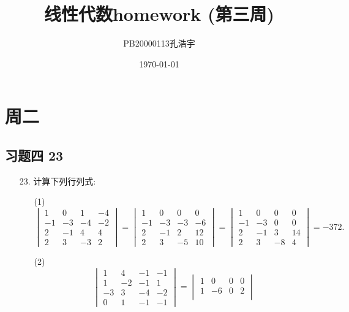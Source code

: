 \documentclass{article}
\title{线性代数homework (第三周)}
\author{PB20000113孔浩宇}
\date{\today}
\begin{document}
\maketitle
\section{周二}
\subsection{习题四 23}
\begin{enumerate}
    \item [23.]计算下列行列式:
    \begin{enumerate}
        \item [(1)]
        \[
            \begin{vmatrix}
                1 & 0 & 1 & -4\\
                -1& -3& -4& -2\\
                2 & -1& 4 & 4 \\
                2 & 3 & -3& 2
            \end{vmatrix}=
            \begin{vmatrix}
                1 & 0 & 0 & 0\\
                -1& -3& -3& -6\\
                2 & -1& 2 & 12\\
                2 & 3 & -5& 10
            \end{vmatrix}=
            \begin{vmatrix}
                1 & 0 & 0 & 0\\
                -1& -3& 0& 0\\
                2 & -1& 3 & 14\\
                2 & 3 & -8& 4
            \end{vmatrix}=-372.
        \]
        \item [(2)]
            \[
            \begin{vmatrix}
                1& 4& -1& -1\\
                1& -2& -1& 1\\
                -3& 3& -4& -2\\
                0& 1& -1& -1
            \end{vmatrix}=
            \begin{vmatrix}
                1& 0 & 0 & 0\\
                1& -6& 0 & 2\\

\end{vmatrix}\]
\end{enumerate}
\end{enumerate}
\end{document}
